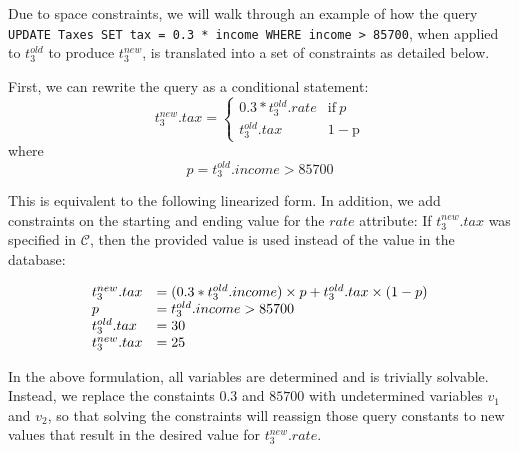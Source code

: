 
Due to space constraints, we will walk through an example of how the query
\texttt{UPDATE Taxes SET tax = 0.3 * income WHERE income > 85700}, when applied to 
$t_3^{old}$ to produce $t_3^{new}$, is translated into a set of constraints
as detailed below.

First, we can rewrite the query as a conditional statement:
\[
t_3^{new}.tax = \begin{cases}
				  0.3*t_3^{old}.rate              & \mathrm{if}\ p  \\
                  t_3^{old}.tax  & \mathrm{1-p}
               \end{cases}
\]
where \[p = t_3^{old}.income > 85700\]

This is equivalent to the following linearized form.
In addition, we add constraints on the starting and ending value for the $rate$ attribute:
If $t_3^{new}.tax$ was specified in $\mathcal{C}$, then the provided value
is used instead of the value in the database:

\[
\begin{array}{l l l}
t_3^{new}.tax &= (0.3*t_3^{old}.income)\times p + t_3^{old}.tax\times (1-p)\\
p &= t_3^{old}.income > 85700\\
t_3^{old}.tax &= 30 \\
t_3^{new}.tax &= 25
\end{array}
\]

In the above formulation, all variables are determined and is trivially
solvable.  Instead, we replace
the constaints $0.3$ and $85700$ with undetermined variables $v_1$ and $v_2$,
so that solving the constraints will reassign those query constants 
to new values that result in the desired value for $t_3^{new}.rate$.  
\iffalse
\[
\begin{array}{l l l}
t_3^{new}.tax &= (v_1*t_3^{old}.income)\times p + t_3^{old}.tax\times (1-p)\\
p              &= t_3^{old}.income > v_2\\
t_3^{old}.tax 30 \\
t_3^{new}.tax &= 25 \\
v_1            &\in [minval, maxval]\\
v_2            &\in [minval, maxval]\\
\end{array}
\]
\fi